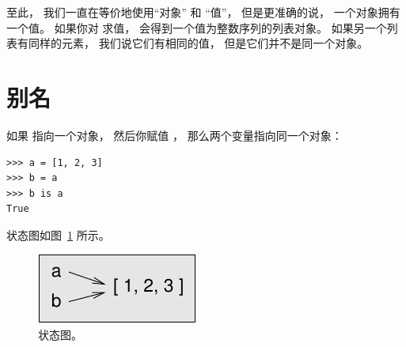
至此， 我们一直在等价地使用``对象'' 和 ``值''， 但是更准确的说， 一个对象拥有一个值。  如果你对 \li{[1, 2, 3]} 求值， 会得到一个值为整数序列的列表对象。
如果另一个列表有同样的元素， 我们说它们有相同的值， 但是它们并不是同一个对象。

  


\section{别名}
  


如果  指向一个对象， 然后你赋值  ， 那么两个变量指向同一个对象：

\begin{lstlisting}
>>> a = [1, 2, 3]
>>> b = a
>>> b is a
True
\end{lstlisting}

%

状态图如图~\ref{fig.list3} 所示。

  

\begin{figure}
\centerline
{\includegraphics[scale=0.8]{../source/figs/list3.pdf}}
\caption{状态图。}
\label{fig.list3}
\end{figure}


